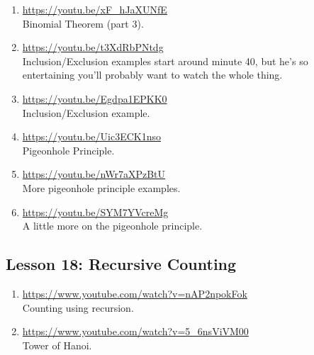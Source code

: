 \documentclass[11pt]{amsart}
\begin{document}
\begin{enumerate}


\item \url{https://youtu.be/xF_hJaXUNfE}\\
Binomial Theorem (part 3).\\[5pt]



\item \url{https://youtu.be/t3XdRbPNtdg}\\
Inclusion/Exclusion examples start around minute 40,
but he's so entertaining you'll probably want to watch
the whole thing.\\[5pt]



\item \url{https://youtu.be/Egdpa1EPKK0}\\
Inclusion/Exclusion example.\\[5pt]



\item \url{https://youtu.be/Uic3ECK1nso}\\
Pigeonhole Principle.\\[5pt]



\item \url{https://youtu.be/nWr7aXPzBtU}\\
More pigeonhole principle examples.\\[5pt]



\item \url{https://youtu.be/SYM7YVcreMg}\\
A little more on the pigeonhole principle.\\[5pt]


\end{enumerate}


\subsection{Lesson 18: Recursive Counting}

\begin{enumerate}

\item \url{https://www.youtube.com/watch?v=nAP2npokFok}\\
Counting using recursion.\\[5pt]



\item \url{https://www.youtube.com/watch?v=5_6nsViVM00}\\
Tower of Hanoi.\\[5pt]


\end{enumerate}
\end{document}

